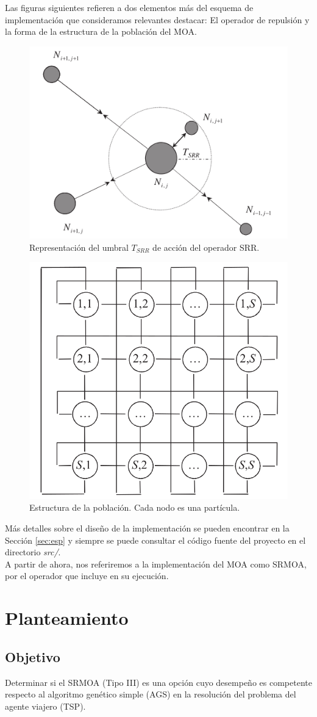 \documentclass[12pt]{article}
\begin{document}
Las figuras siguientes refieren a dos elementos más del esquema de
implementación que consideramos relevantes destacar: El operador de repulsión y la forma de la estructura de la población del MOA.\newpage
\begin{multicols}{2}
\begin{figure}[H]
  \centering
  \includegraphics[width=.5\textwidth]{SRR}
  \caption{Representación del umbral $T_{SRR}$ de acción del operador SRR.}
\end{figure}
\begin{figure}[H]
  \centering
  \includegraphics[width=.437\textwidth]{cell}
  \caption{Estructura de la población. Cada nodo es una partícula.}
\end{figure}
\end{multicols}
Más detalles sobre el diseño de la implementación se pueden encontrar en la Sección \ref{sec:esp} y siempre se puede consultar el código fuente
del proyecto en el directorio \textit{src/}.\\

A partir de ahora, nos referiremos a la implementación del MOA como SRMOA, por el operador que incluye en su ejecución.
\newpage
\section{Planteamiento}
\subsection*{Objetivo}
Determinar si el SRMOA (Tipo III) es una opción cuyo desempeño es competente respecto al algoritmo genético simple (AGS) en la resolución del problema del agente viajero (TSP).
\end{document}
